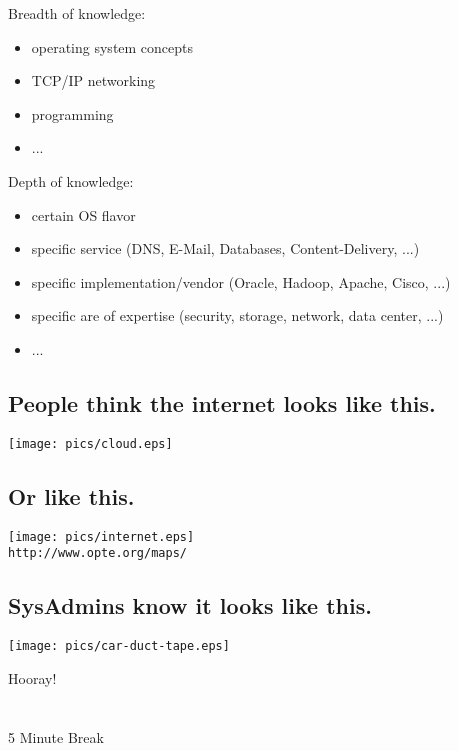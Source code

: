 \documentclass[xga]{xdvislides}
\begin{document}
Breadth of knowledge:
\begin{itemize}
	\item operating system concepts
	\item TCP/IP networking
	\item programming
	\item ...
\end{itemize}
\vspace{.5in}

Depth of knowledge:
\begin{itemize}
	\item certain OS flavor
	\item specific service (DNS, E-Mail, Databases, Content-Delivery, ...)
	\item specific implementation/vendor (Oracle, Hadoop, Apache, Cisco, ...)
	\item specific are of expertise (security, storage, network, data center, ...)
	\item ...
\end{itemize}

\subsection{People think the internet looks like this.}
\begin{center}
	\texttt{[image: pics/cloud.eps]}
\end{center}

\subsection{Or like this.}
\begin{center}
	\texttt{[image: pics/internet.eps]} \\
	\small
	{\tt http://www.opte.org/maps/}
	\Normalsize
\end{center}

\subsection{SysAdmins know it looks like this.}
\vspace*{\fill}
\begin{center}
    \texttt{[image: pics/car-duct-tape.eps]}
\end{center}
\vspace*{\fill}

\newpage
\vspace*{\fill}
\begin{center}
    \Hugesize
        Hooray! \\ [1em]
    \hspace*{5mm}
    \blueline\\
    \hspace*{5mm}\\
        5 Minute Break
\end{center}
\vspace*{\fill}
\end{document}
